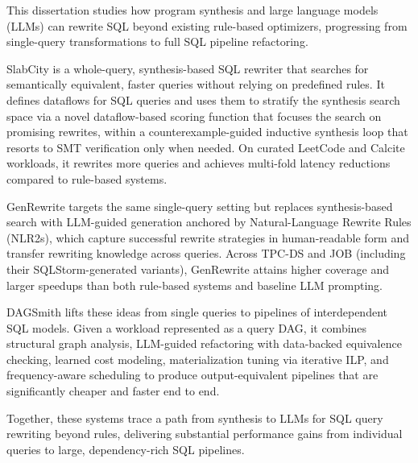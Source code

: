 This dissertation studies how program synthesis and large language
models (LLMs) can rewrite SQL beyond existing rule-based optimizers,
progressing from single-query transformations to full SQL pipeline
refactoring.

SlabCity is a whole-query, synthesis-based SQL rewriter that searches
for semantically equivalent, faster queries without relying on
predefined rules. It defines dataflows for SQL queries and uses them
to stratify the synthesis search space via a novel dataflow-based
scoring function that focuses the search on promising rewrites, within
a counterexample-guided inductive synthesis loop that resorts to SMT
verification only when needed. On curated LeetCode and Calcite
workloads, it rewrites more queries and achieves multi-fold latency
reductions compared to rule-based systems.

GenRewrite targets the same single-query setting but replaces
synthesis-based search with LLM-guided generation anchored by
Natural-Language Rewrite Rules (NLR2s), which capture successful
rewrite strategies in human-readable form and transfer rewriting
knowledge across queries. Across TPC-DS and JOB (including their
SQLStorm-generated variants), GenRewrite attains higher coverage and
larger speedups than both rule-based systems and baseline LLM
prompting.

DAGSmith lifts these ideas from single queries to pipelines of
interdependent SQL models. Given a workload represented as a query
DAG, it combines structural graph analysis, LLM-guided refactoring
with data-backed equivalence checking, learned cost modeling,
materialization tuning via iterative ILP, and frequency-aware
scheduling to produce output-equivalent pipelines that are
significantly cheaper and faster end to end.

Together, these systems trace a path from synthesis to LLMs for SQL
query rewriting beyond rules, delivering substantial performance gains
from individual queries to large, dependency-rich SQL pipelines.
